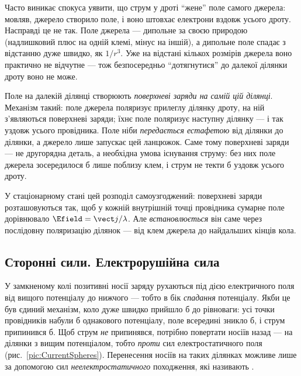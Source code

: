 \begin{Attention}
	Часто виникає спокуса уявити, що струм у дроті \enquote{жене} поле самого джерела: мовляв, джерело створило поле, і воно штовхає електрони
	вздовж усього дроту. Насправді це не так. Поле джерела --- дипольне за своєю природою (надлишковий плюс на одній клемі, мінус на
	іншій), а дипольне поле спадає з відстанню дуже швидко, як $1/r^3$. Уже на відстані кількох розмірів джерела воно практично не
	відчутне --- тож безпосередньо \enquote{дотягнутися} до далекої ділянки дроту воно не може.

	Поле на далекій ділянці створюють \emph{поверхневі заряди на самій цій ділянці}. Механізм такий: поле джерела поляризує прилеглу
	ділянку дроту, на ній з'являються поверхневі заряди; їхнє поле поляризує наступну ділянку --- і так уздовж усього провідника. Поле
	ніби \emph{передається естафетою} від ділянки до ділянки, а джерело лише запускає цей ланцюжок. Саме тому поверхневі заряди --- не
	другорядна деталь, а необхідна умова існування струму: без них поле джерела зосередилося б лише поблизу клем, і струм не текти б
	уздовж усього дроту.

	У стаціонарному стані цей розподіл самоузгоджений: поверхневі заряди розташовуються так, щоб у кожній внутрішній точці провідника
	сумарне поле дорівнювало $\Efield = \vect j/\lambda$. Але \emph{встановлюється} він саме через послідовну поляризацію ділянок ---
	від клем джерела до найдальших кінців кола.
\end{Attention}

\subsection*{Сторонні сили. Електрорушійна сила}

У замкненому колі позитивні носії заряду рухаються під дією електричного поля від вищого потенціалу до нижчого --- тобто в бік
\emph{спадання} потенціалу. Якби це був єдиний механізм, коло дуже швидко прийшло б до рівноваги: усі точки провідників набули б
однакового потенціалу, поле всередині зникло б, і струм припинився б. Щоб струм \emph{не} припинявся, потрібно повертати носіїв
назад --- на ділянки з вищим потенціалом, тобто \emph{проти} сил електростатичного поля (рис.~\ref{pic:CurrentSpheres}). Перенесення
носіїв на таких ділянках можливе лише за допомогою сил \emph{неелектростатичного} походження, які називають .

